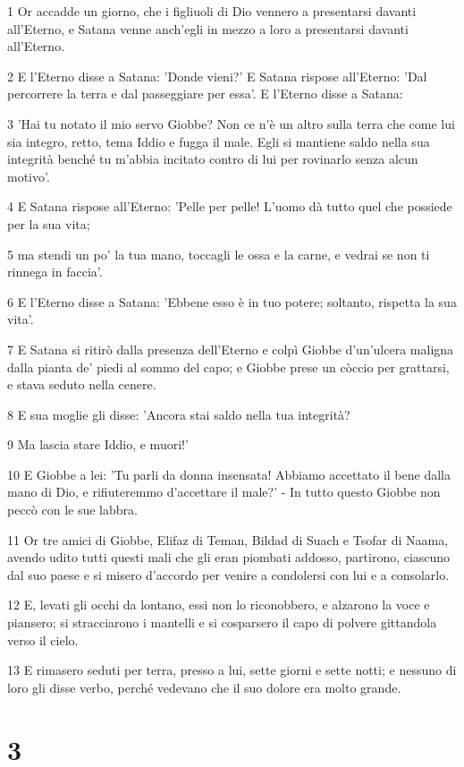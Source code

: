 \par 1 Or accadde un giorno, che i figliuoli di Dio vennero a presentarsi davanti all'Eterno, e Satana venne anch'egli in mezzo a loro a presentarsi davanti all'Eterno.
\par 2 E l'Eterno disse a Satana: 'Donde vieni?' E Satana rispose all'Eterno: 'Dal percorrere la terra e dal passeggiare per essa'. E l'Eterno disse a Satana:
\par 3 'Hai tu notato il mio servo Giobbe? Non ce n'è un altro sulla terra che come lui sia integro, retto, tema Iddio e fugga il male. Egli si mantiene saldo nella sua integrità benché tu m'abbia incitato contro di lui per rovinarlo senza alcun motivo'.
\par 4 E Satana rispose all'Eterno: 'Pelle per pelle! L'uomo dà tutto quel che possiede per la sua vita;
\par 5 ma stendi un po' la tua mano, toccagli le ossa e la carne, e vedrai se non ti rinnega in faccia'.
\par 6 E l'Eterno disse a Satana: 'Ebbene esso è in tuo potere; soltanto, rispetta la sua vita'.
\par 7 E Satana si ritirò dalla presenza dell'Eterno e colpì Giobbe d'un'ulcera maligna dalla pianta de' piedi al sommo del capo; e Giobbe prese un còccio per grattarsi, e stava seduto nella cenere.
\par 8 E sua moglie gli disse: 'Ancora stai saldo nella tua integrità?
\par 9 Ma lascia stare Iddio, e muori!'
\par 10 E Giobbe a lei: 'Tu parli da donna insensata! Abbiamo accettato il bene dalla mano di Dio, e rifiuteremmo d'accettare il male?' - In tutto questo Giobbe non peccò con le sue labbra.
\par 11 Or tre amici di Giobbe, Elifaz di Teman, Bildad di Suach e Tsofar di Naama, avendo udito tutti questi mali che gli eran piombati addosso, partirono, ciascuno dal suo paese e si misero d'accordo per venire a condolersi con lui e a consolarlo.
\par 12 E, levati gli occhi da lontano, essi non lo riconobbero, e alzarono la voce e piansero; si stracciarono i mantelli e si cosparsero il capo di polvere gittandola verso il cielo.
\par 13 E rimasero seduti per terra, presso a lui, sette giorni e sette notti; e nessuno di loro gli disse verbo, perché vedevano che il suo dolore era molto grande.

\chapter{3}

